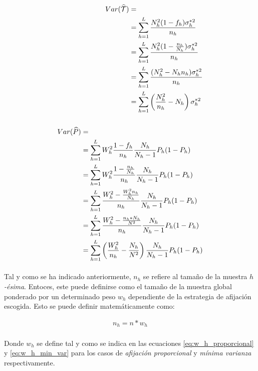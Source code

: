 \documentclass{article}
\begin{document}
    \begin{align}
      \label{eq:tau_var}
      \begin{split}
        Var(\widehat{\mathcal{T}}) &= \\
        &= \sum\limits_{h=1}^L\frac{N_h^2 (1-f_h)\sigma_h^{*2}}{n_h} \\
        &= \sum\limits_{h=1}^L\frac{N_h^2 (1-\frac{n_h}{N_h})\sigma_h^{*2}}{n_h} \\
        &= \sum\limits_{h=1}^L\frac{(N_h^2- N_hn_h)\sigma_h^{*2}}{n_h} \\
        &= \sum\limits_{h=1}^L\left(\frac{N_h^2}{n_h}- N_h\right)\sigma_h^{*2}
      \end{split} \\ \\
    \label{eq:p_var}
      \begin{split}
        Var(\widehat{P}) &=\\
        &= \sum\limits_{h=1}^LW_h^2\frac{1-f_h}{n_h}\frac{N_h}{N_h-1}P_h(1-P_h) \\
        &= \sum\limits_{h=1}^LW_h^2\frac{1-\frac{n_h}{N_h}}{n_h}\frac{N_h}{N_h-1}P_h(1-P_h) \\
        &= \sum\limits_{h=1}^L\frac{W_h^2-\frac{W_h^2n_h}{N_h}}{n_h}\frac{N_h}{N_h-1}P_h(1-P_h) \\
        &= \sum\limits_{h=1}^L\frac{W_h^2-\frac{n_h*N_h}{N^2}}{n_h}\frac{N_h}{N_h-1}P_h(1-P_h) \\
        &= \sum\limits_{h=1}^L\left(\frac{W_h^2}{n_h} - \frac{N_h}{N^2}\right)\frac{N_h}{N_h-1}P_h(1-P_h)
      \end{split}
    \end{align}

    \paragraph{}
    Tal y como se ha indicado anteriormente, $n_h$ se refiere al tamaño de la muestra \emph{$h$-ésima}. Entoces, este puede definirse como el tamaño de la muestra global ponderado por un determinado peso $w_h$  dependiente de la estrategia de afijación escogida. Esto se puede definir matemáticamente como:

    \begin{align}
      n_h = n * w_h
    \end{align}

    \paragraph{}
    Donde $w_h$ se define tal y como se indica en las ecuaciones \eqref{eq:w_h_proporcional} y \eqref{eq:w_h_min_var} para los casos de \emph{afijación proporcional} y \emph{mínima varianza} respectivamente.
\end{document}
